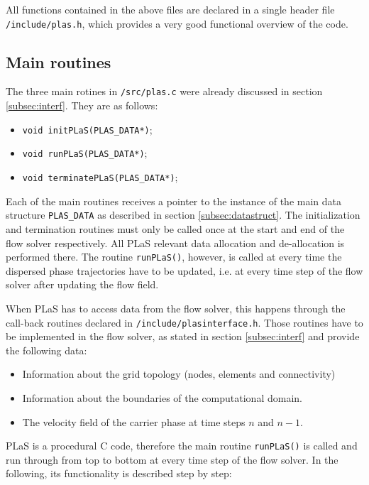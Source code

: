 \documentclass[12pt]{article}
\begin{document}
All functions contained in the above files are declared in a single header file {\tt{/include/plas.h}}, which provides a very good functional overview of the code.

\subsection{Main routines}
\label{subsec:mainroutine}

The three main rotines in {\tt{/src/plas.c}} were already discussed in section \ref{subsec:interf}. They are as follows:

\begin{itemize}
\item {\tt{void initPLaS(PLAS\_DATA*)}};
\item {\tt{void runPLaS(PLAS\_DATA*)}};
\item {\tt{void terminatePLaS(PLAS\_DATA*)}};
\end{itemize}

Each of the main routines receives a pointer to the instance of the main data structure {\tt{PLAS\_DATA}} as described in section \ref{subsec:datastruct}. The initialization and termination routines must only be called once at the start and end of the flow solver respectively. All PLaS relevant data allocation and de-allocation is performed there. The routine {\tt{runPLaS()}}, however, is called at every time the dispersed phase trajectories have to be updated, i.e. at every time step of the flow solver after updating the flow field.

When PLaS has to access data from the flow solver, this happens through the call-back routines declared in {\tt{/include/plasinterface.h}}. Those routines have to be implemented in the flow solver, as stated in section \ref{subsec:interf} and provide the following data:

\begin{itemize}
\item Information about the grid topology (nodes, elements and connectivity)
\item Information about the boundaries of the computational domain.
\item The velocity field of the carrier phase at time steps $n$ and $n-1$.
\end{itemize}

PLaS is a procedural C code, therefore the main routine {\tt{runPLaS()}} is called and run through from top to bottom at every time step of the flow solver. In the following, its functionality is described step by step:
\end{document}
